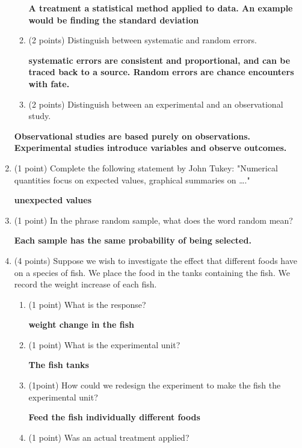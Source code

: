 \documentclass{article}
\begin{document}
\begin{enumerate}
\begin{enumerate}
	\textbf{A treatment a statistical method applied to data. An example would be finding the standard deviation } \\
	
	\item (2 points) Distinguish between systematic and random errors.
	
	\textbf{systematic errors are consistent and proportional, and can be traced back to a source. Random errors are chance encounters with fate.} \\
	
	
	\item (2 points) Distinguish between an experimental and an observational study.
	\end{enumerate}
	
	\textbf{Observational studies are based purely on observations. Experimental studies introduce variables and observe outcomes. } \\


\item (1 point) Complete the following statement by John Tukey: "Numerical quantities focus on expected values, graphical summaries on …."

\textbf{unexpected values} \\

\item (1 point) In the phrase random sample, what does the word random mean?

\textbf{Each sample has the same probability of being selected.}


\item (4 points) Suppose we wish to investigate the effect that different foods have on a species of fish. We place the food in the tanks containing the fish. We record the weight increase of each fish.
	\begin{enumerate}
	\item (1 point) What is the response?
	
	\textbf{weight change in the fish} \\
	
	\item (1 point) What is the experimental unit?
	
	\textbf{The fish tanks} \\
	
	\item (1point) How could we redesign the experiment to make the fish the experimental unit?
	
	\textbf{Feed the fish individually different foods} \\
	\item (1 point) Was an actual treatment applied?
	

\end{enumerate}
\end{enumerate}
\end{document}
